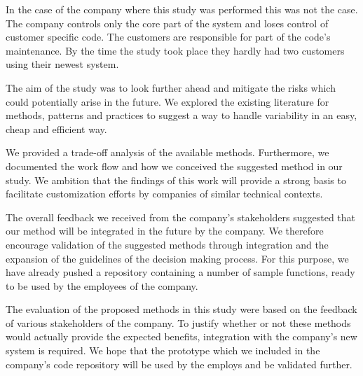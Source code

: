 In the case of the company where this study was performed this was not the case. The company controls only the core part of the system and loses control of customer specific code. The customers are responsible for part of the code's maintenance. By the time the study took place they hardly had two customers using their newest system. 

The aim of the study was to look further ahead and mitigate the risks which could potentially arise in the future. We explored the existing literature for methods, patterns and practices to suggest a way to handle variability in an easy, cheap and efficient way. 

We provided a trade-off analysis of the available methods. Furthermore, we documented the work flow and how we conceived the suggested method in our study. We ambition that the findings of this work will provide a strong basis to facilitate customization efforts by companies of similar technical contexts. 

The overall feedback we received  from the company's stakeholders suggested that our method will be integrated in the future by the company. We therefore encourage validation of the suggested methods through integration and the expansion of the guidelines of the decision making process. For this purpose, we have already pushed a repository containing a number of sample functions, ready to be used by the employees of the company.

 








The evaluation of the proposed methods in this study were based on the feedback of various stakeholders of the company. To justify whether or not these methods would actually provide the expected benefits, integration with the company's new system is required. We hope that the prototype which we included in the company's code repository will be used by the employs and be validated further.



